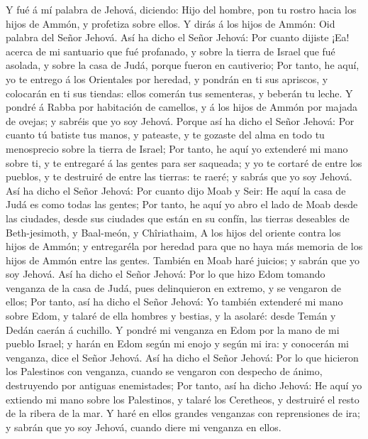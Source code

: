  Y fué á mí palabra de Jehová, diciendo:  Hijo
del hombre, pon tu rostro hacia los hijos de Ammón, y profetiza sobre
ellos.  Y dirás á los hijos de Ammón: Oid palabra del Señor
Jehová. Así ha dicho el Señor Jehová: Por cuanto dijiste ¡Ea! acerca de
mi santuario que fué profanado, y sobre la tierra de Israel que fué
asolada, y sobre la casa de Judá, porque fueron en cautiverio;
 Por tanto, he aquí, yo te entrego á los Orientales por
heredad, y pondrán en ti sus apriscos, y colocarán en ti sus tiendas:
ellos comerán tus sementeras, y beberán tu leche.  Y pondré
á Rabba por habitación de camellos, y á los hijos de Ammón por majada de
ovejas; y sabréis que yo soy Jehová.  Porque así ha dicho el
Señor Jehová: Por cuanto tú batiste tus manos, y pateaste, y te gozaste
del alma en todo tu menosprecio sobre la tierra de Israel; 
Por tanto, he aquí yo extenderé mi mano sobre ti, y te entregaré á las
gentes para ser saqueada; y yo te cortaré de entre los pueblos, y te
destruiré de entre las tierras: te raeré; y sabrás que yo soy Jehová.
 Así ha dicho el Señor Jehová: Por cuanto dijo Moab y Seir:
He aquí la casa de Judá es como todas las gentes;  Por
tanto, he aquí yo abro el lado de Moab desde las ciudades, desde sus
ciudades que están en su confín, las tierras deseables de Beth-jesimoth,
y Baal-meón, y Chîriathaim,  A los hijos del oriente contra
los hijos de Ammón; y entregaréla por heredad para que no haya más
memoria de los hijos de Ammón entre las gentes.  También en
Moab haré juicios; y sabrán que yo soy Jehová.  Así ha
dicho el Señor Jehová: Por lo que hizo Edom tomando venganza de la casa
de Judá, pues delinquieron en extremo, y se vengaron de ellos;
 Por tanto, así ha dicho el Señor Jehová: Yo también
extenderé mi mano sobre Edom, y talaré de ella hombres y bestias, y la
asolaré: desde Temán y Dedán caerán á cuchillo.  Y pondré
mi venganza en Edom por la mano de mi pueblo Israel; y harán en Edom
según mi enojo y según mi ira: y conocerán mi venganza, dice el Señor
Jehová.  Así ha dicho el Señor Jehová: Por lo que hicieron
los Palestinos con venganza, cuando se vengaron con despecho de ánimo,
destruyendo por antiguas enemistades;  Por tanto, así ha
dicho Jehová: He aquí yo extiendo mi mano sobre los Palestinos, y talaré
los Ceretheos, y destruiré el resto de la ribera de la mar.
 Y haré en ellos grandes venganzas con reprensiones de ira;
y sabrán que yo soy Jehová, cuando diere mi venganza en ellos.

